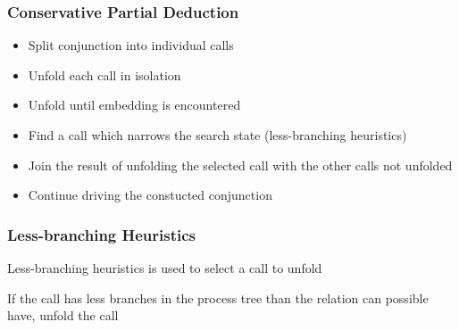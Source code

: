 \documentclass[xcolor=table]{beamer}
\newcommand{\rel}[2]{\texttt{#1}$^o$ #2}
\newcommand{\subst}[1]{$\langle$#1$\rangle$}
\begin{document}
\begin{frame}[fragile]
  \frametitle{Conservative Partial Deduction}
\begin{itemize}
  \item Split conjunction into individual calls
  \item Unfold each call in isolation
  \item Unfold until embedding is encountered
  \item Find a call which narrows the search state (less-branching heuristics)
  \item Join the result of unfolding the selected call with the other calls not unfolded
  \item Continue driving the constucted conjunction
\end{itemize}

\end{frame}

\begin{frame}[fragile]
  \frametitle{Less-branching Heuristics}

  \begin{center}
    Less-branching heuristics is used to select a call to unfold

    \vspace{0.5cm}

    If the call has less branches in the process tree than the relation can possible have, unfold the call
  \end{center}

\vspace{0.5cm}


  \begin{columns}
    \begin{column}[]{0.65\textwidth}
      \begin{center}
        
      \end{center}
    \end{column}
    \begin{column}[]{0.35\textwidth}
      \begin{center}
      \end{center}
    \end{column}
  \end{columns}
\end{frame}
\end{document}

